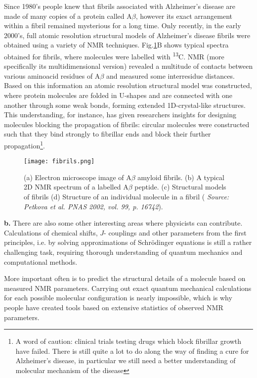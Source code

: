 \documentclass[a4paper, 12pt]{article}
\begin{document}
Since 1980's people knew that fibrils associated with Alzheimer's disease are made of many copies of a protein called A$\beta$, however its exact arrangement within a fibril remained mysterious for a long time. Only recently, in the early 2000's, full atomic resolution structural models of Alzheimer's disease fibrils were obtained using a variety of NMR techniques. Fig.\ref{fig:fibrils}B shows typical spectra obtained for fibrils, where molecules were labelled with \textsuperscript{13}C. NMR (more specifically its multidimensional version) revealed a multitude of contacts between various aminoacid residues of A$\beta$ and measured some interresidue distances. Based on this information an atomic resolution structural model was constructed, where protein molecules are folded in U-shapes and are connected with one another through some weak bonds, forming extended 1D-crystal-like structures. This understanding, for instance, has given researchers insights for designing molecules blocking the propagation of fibrils: circular molecules were constructed such that they bind strongly to fibrillar ends and block their further propagation\footnote{A word of caution: clinical trials testing drugs which block fibrillar growth have failed. There is still quite a lot to do along the way of finding a cure for Alzheimer's disease, in particular we still need a better understanding of molecular mechanism of the disease}.

\begin{figure}[ht]
\caption{(a) Electron microscope image of A$\beta$ amyloid fibrils. (b) A typical 2D NMR spectrum of a labelled A$\beta$ peptide. (c) Structural models of fibrils (d) Structure of an individual molecule in a fibril ( \textit{Source: Petkova et al. PNAS 2002, vol. 99, p. 16742}).}
\label{fig:fibrils}
\centering
\texttt{[image: fibrils.png]}
\end{figure}


\textbf{b.} There are also some other interesting areas where physicists can contribute. Calculations of chemical shifts, $J$- couplings and other parameters from the first principles, i.e. by solving approximations of Schr{\"o}dinger equations is still a rather challenging task, requiring thorough understanding of quantum mechanics and computational methods.

  More important often is to predict the structural details of a molecule based on measured NMR parameters. Carrying out exact quantum mechanical calculations for each possible molecular configuration is nearly impossible, which is why people have created tools based on extensive statistics of observed NMR parameters. 
 
\end{document}
